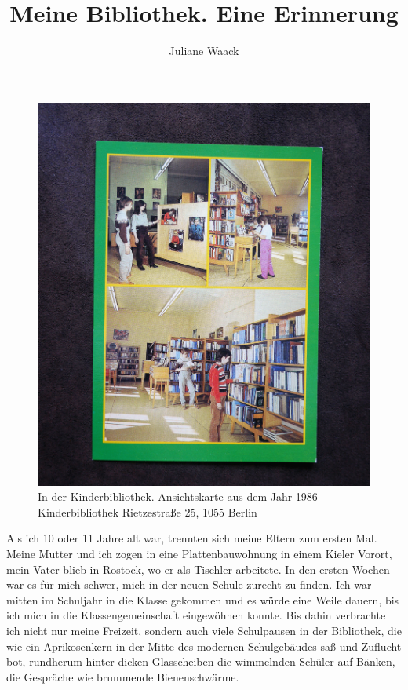 \documentclass[a4paper,
fontsize=11pt,
oneside,
numbers=noperiodatend,
parskip=half-,
bibliography=totoc,
final
]{scrartcl}
\title{\LARGE{Meine Bibliothek. Eine Erinnerung}} %
\author{Juliane Waack} %
\date{}
\begin{document}
\maketitle
\thispagestyle{fancyplain} 


\begin{figure}
\centering
\includegraphics{Kinderbibliothek-1.jpg}
\caption{In der Kinderbibliothek. Ansichtskarte aus dem Jahr 1986 -
Kinderbibliothek Rietzestraße 25, 1055 Berlin}
\end{figure}

Als ich 10 oder 11 Jahre alt war, trennten sich meine Eltern zum ersten
Mal. Meine Mutter und ich zogen in eine Plattenbauwohnung in einem
Kieler Vorort, mein Vater blieb in Rostock, wo er als Tischler
arbeitete. In den ersten Wochen war es für mich schwer, mich in der
neuen Schule zurecht zu finden. Ich war mitten im Schuljahr in die
Klasse gekommen und es würde eine Weile dauern, bis ich mich in die
Klassengemeinschaft eingewöhnen konnte. Bis dahin verbrachte ich nicht
nur meine Freizeit, sondern auch viele Schulpausen in der Bibliothek,
die wie ein Aprikosenkern in der Mitte des modernen Schulgebäudes saß
und Zuflucht bot, rundherum hinter dicken Glasscheiben die wimmelnden
Schüler auf Bänken, die Gespräche wie brummende Bienenschwärme.
\end{document}
